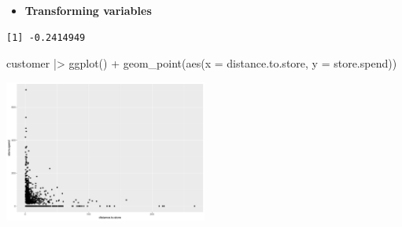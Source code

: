 \documentclass[
  ignorenonframetext,
]{beamer}
\newenvironment{Shaded}{\begin{snugshade}}{\end{snugshade}}
\newcommand{\AttributeTok}[1]{\textcolor[rgb]{0.40,0.45,0.13}{#1}}
\newcommand{\FunctionTok}[1]{\textcolor[rgb]{0.28,0.35,0.67}{#1}}
\newcommand{\NormalTok}[1]{\textcolor[rgb]{0.00,0.23,0.31}{#1}}
\newcommand{\SpecialCharTok}[1]{\textcolor[rgb]{0.37,0.37,0.37}{#1}}
\providecommand{\tightlist}{%
  \setlength{\itemsep}{0pt}\setlength{\parskip}{0pt}}\usepackage{longtable,booktabs,array}
\begin{document}
\begin{frame}[fragile]{}
\label{section-21}
\begin{itemize}
\tightlist
\item
  \textbf{Transforming variables}
\end{itemize}

\tiny

\begin{Shaded}
\end{Shaded}

\begin{verbatim}
[1] -0.2414949
\end{verbatim}

\begin{Shaded}
\begin{Highlighting}[]
\NormalTok{customer }\SpecialCharTok{|\textgreater{}} \FunctionTok{ggplot}\NormalTok{() }\SpecialCharTok{+}
  \FunctionTok{geom\_point}\NormalTok{(}\FunctionTok{aes}\NormalTok{(}\AttributeTok{x =}\NormalTok{ distance.to.store, }\AttributeTok{y =}\NormalTok{ store.spend))}
\end{Highlighting}
\end{Shaded}

\begin{center}
\includegraphics[width=0.5\textwidth,height=\textheight]{004_relationships_between_continuous_variables_files/figure-beamer/unnamed-chunk-20-1.pdf}
\end{center}
\end{frame}
\end{document}
